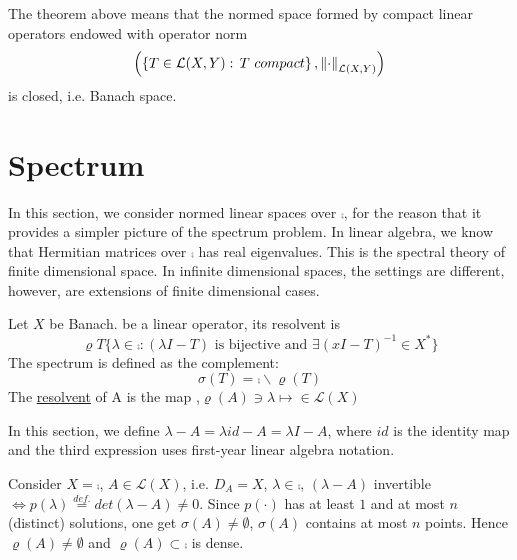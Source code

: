 \begin{remark}\nl
    The theorem above means that the normed space  formed by compact linear operators endowed with operator norm
$$
\left(\left\{T\in\mathcal{L}(X,Y):\, T\,\,compact\right\},\left\|{\cdot}\right\|_{\mathcal{L}(X,Y)}\right)
$$
is closed, i.e. Banach space.
\end{remark}


\section{Spectrum}
In this section, we consider normed linear spaces over $\comp$, for the reason that it provides a simpler picture of the spectrum problem. In linear algebra, we know that Hermitian matrices over $\comp$ has real eigenvalues. This is the spectral theory of finite dimensional space. In infinite dimensional spaces, the settings are different, however, are extensions of finite dimensional cases.

\begin{definition}\nl
Let $X$ be Banach.  be a linear operator, its resolvent is
$$
\varrho{T}
\{
\lambda\in\comp:(\lambda I-T) \text{ is bijective and } \exists (xI-T)^{-1}\in X^*
\}
$$
The spectrum is defined as the complement:
$$
\sigma(T)=\comp\backslash\varrho(T)
$$
The {\underline{resolvent}} of A is the map ,$\varrho(A)\ni\lambda\mapsto \in\mathcal{L}(X)$
\end{definition}

\begin{remark}\nl
    In this section, we define $\lambda-A=\lambda id -A=\lambda I-A$, where $id$ is the identity map and the third expression uses first-year linear algebra notation.
\end{remark}

\begin{example}
    Consider $X=\comp$, $A\in \mathcal{L}(X)$, i.e. $D_A=X$, $\lambda\in\comp$, $(\lambda-A)$ invertible $\iff p(\lambda)\stackrel{def.}{=}det(\lambda-A)\neq0$. Since  $p(\cdot)$ has at least $1$ and at most $n$ (distinct) solutions, one get $\sigma(A)\neq \emptyset$, $\sigma(A)$ contains at most $n$ points. Hence $\varrho(A)\neq\emptyset$ and $\varrho(A)\subset\comp$ is dense.
\end{example}

